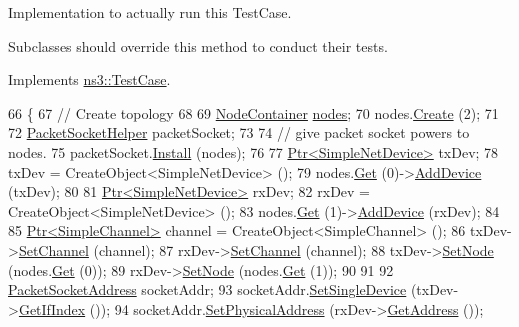 Implementation to actually run this Test\+Case. 

Subclasses should override this method to conduct their tests. 

Implements \hyperlink{classns3_1_1TestCase_a8ff74680cf017ed42011e4be51917a24}{ns3\+::\+Test\+Case}.


\begin{DoxyCode}
66 \{
67   \textcolor{comment}{// Create topology}
68 
69   \hyperlink{classns3_1_1NodeContainer}{NodeContainer} \hyperlink{visualizer-ideas_8txt_a3e1b3808014a2c68ab0cd0182e041be2}{nodes};
70   nodes.\hyperlink{classns3_1_1NodeContainer_a787f059e2813e8b951cc6914d11dfe69}{Create} (2);
71 
72   \hyperlink{classns3_1_1PacketSocketHelper}{PacketSocketHelper} packetSocket;
73 
74   \textcolor{comment}{// give packet socket powers to nodes.}
75   packetSocket.\hyperlink{classns3_1_1PacketSocketHelper_a33f449fee7fd10411949d17feba6d33e}{Install} (nodes);
76 
77   \hyperlink{classns3_1_1Ptr}{Ptr<SimpleNetDevice>} txDev;
78   txDev = CreateObject<SimpleNetDevice> ();
79   nodes.\hyperlink{classns3_1_1NodeContainer_a9ed96e2ecc22e0f5a3d4842eb9bf90bf}{Get} (0)->\hyperlink{classns3_1_1Node_a42ff83ee1d5d1649c770d3f5b62375de}{AddDevice} (txDev);
80 
81   \hyperlink{classns3_1_1Ptr}{Ptr<SimpleNetDevice>} rxDev;
82   rxDev = CreateObject<SimpleNetDevice> ();
83   nodes.\hyperlink{classns3_1_1NodeContainer_a9ed96e2ecc22e0f5a3d4842eb9bf90bf}{Get} (1)->\hyperlink{classns3_1_1Node_a42ff83ee1d5d1649c770d3f5b62375de}{AddDevice} (rxDev);
84 
85   \hyperlink{classns3_1_1Ptr}{Ptr<SimpleChannel>} channel = CreateObject<SimpleChannel> ();
86   txDev->\hyperlink{classns3_1_1SimpleNetDevice_af9e9828ad584b5ba538f18f645f162e0}{SetChannel} (channel);
87   rxDev->\hyperlink{classns3_1_1SimpleNetDevice_af9e9828ad584b5ba538f18f645f162e0}{SetChannel} (channel);
88   txDev->\hyperlink{classns3_1_1SimpleNetDevice_a7b0e64c1e4ee9841de0a892db96ddd68}{SetNode} (nodes.\hyperlink{classns3_1_1NodeContainer_a9ed96e2ecc22e0f5a3d4842eb9bf90bf}{Get} (0));
89   rxDev->\hyperlink{classns3_1_1SimpleNetDevice_a7b0e64c1e4ee9841de0a892db96ddd68}{SetNode} (nodes.\hyperlink{classns3_1_1NodeContainer_a9ed96e2ecc22e0f5a3d4842eb9bf90bf}{Get} (1));
90 
91 
92   \hyperlink{classns3_1_1PacketSocketAddress}{PacketSocketAddress} socketAddr;
93   socketAddr.\hyperlink{classns3_1_1PacketSocketAddress_ad1caa016f4d27c9d5f2c06dbfc53f8a3}{SetSingleDevice} (txDev->\hyperlink{classns3_1_1SimpleNetDevice_ad49c077636c82c11b3d76dcb12dfa203}{GetIfIndex} ());
94   socketAddr.\hyperlink{classns3_1_1PacketSocketAddress_a9452f9410a97e57344e464e25c2ab0f3}{SetPhysicalAddress} (rxDev->\hyperlink{classns3_1_1SimpleNetDevice_a813ed60e4386e8f46493a575f636606a}{GetAddress} ());

\end{DoxyCode}

